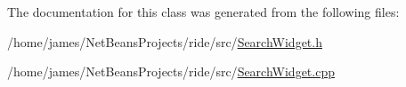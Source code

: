 The documentation for this class was generated from the following files\-:\begin{DoxyCompactItemize}
\item 
/home/james/\-Net\-Beans\-Projects/ride/src/\hyperlink{_search_widget_8h}{Search\-Widget.\-h}\item 
/home/james/\-Net\-Beans\-Projects/ride/src/\hyperlink{_search_widget_8cpp}{Search\-Widget.\-cpp}\end{DoxyCompactItemize}
